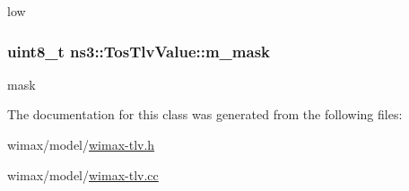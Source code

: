 low 

\subsubsection[{\texorpdfstring{m\+\_\+mask}{m_mask}}]{\setlength{\rightskip}{0pt plus 5cm}uint8\+\_\+t ns3\+::\+Tos\+Tlv\+Value\+::m\+\_\+mask\hspace{0.3cm}{\ttfamily [private]}}\hypertarget{classns3_1_1TosTlvValue_acf7548f92749ca8b7104b2bb6968fc15}{}\label{classns3_1_1TosTlvValue_acf7548f92749ca8b7104b2bb6968fc15}


mask 



The documentation for this class was generated from the following files\+:\begin{DoxyCompactItemize}
\item 
wimax/model/\hyperlink{wimax-tlv_8h}{wimax-\/tlv.\+h}\item 
wimax/model/\hyperlink{wimax-tlv_8cc}{wimax-\/tlv.\+cc}\end{DoxyCompactItemize}
